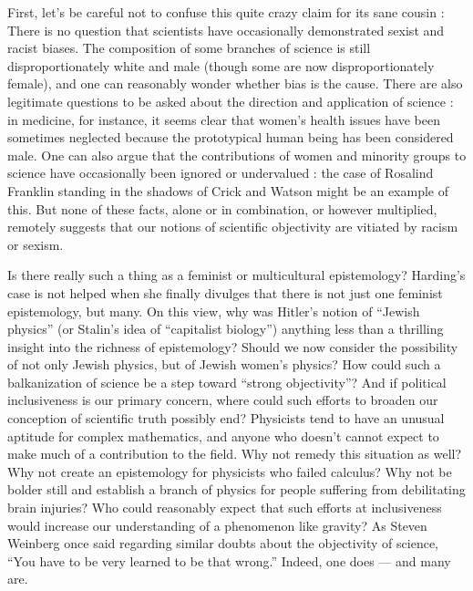 \documentclass[a4paper,14pt]{extbook}
\begin{document}
First, let's be careful not to confuse this quite crazy claim for its sane cousin :
There is no question that scientists have occasionally demonstrated sexist and racist biases.
The composition of some branches of science is still disproportionately white and male (though some are now disproportionately female), and one can reasonably wonder whether bias is the cause.
There are also legitimate questions to be asked about the direction and application of science :
in medicine, for instance, it seems clear that women's health issues have been sometimes neglected because the prototypical human being has been considered male.
One can also argue that the contributions of women and minority groups to science have occasionally been ignored or undervalued :
the case of Rosalind Franklin standing in the shadows of Crick and Watson might be an example of this.
But none of these facts, alone or in combination, or however multiplied, remotely suggests that our notions of scientific objectivity are vitiated by racism or sexism.

Is there really such a thing as a feminist or multicultural epistemology?
Harding's case is not helped when she finally divulges that there is not just one feminist epistemology, but many.
On this view, why was Hitler's notion of ``Jewish physics'' (or Stalin's idea of ``capitalist biology'') anything less than a thrilling insight into the richness of epistemology?
Should we now consider the possibility of not only Jewish physics, but of Jewish women's physics?
How could such a balkanization of science be a step toward ``strong objectivity''?
And if political inclusiveness is our primary concern, where could such efforts to broaden our conception of scientific truth possibly end?
Physicists tend to have an unusual aptitude for complex mathematics, and anyone who doesn't cannot expect to make much of a contribution to the field.
Why not remedy this situation as well?
Why not create an epistemology for physicists who failed calculus?
Why not be bolder still and establish a branch of physics for people suffering from debilitating brain injuries?
Who could reasonably expect that such efforts at inclusiveness would increase our understanding of a phenomenon like gravity?
As Steven Weinberg once said regarding similar doubts about the objectivity of science, ``You have to be very learned to be that wrong.''
Indeed, one does --- and many are.
\end{document}
